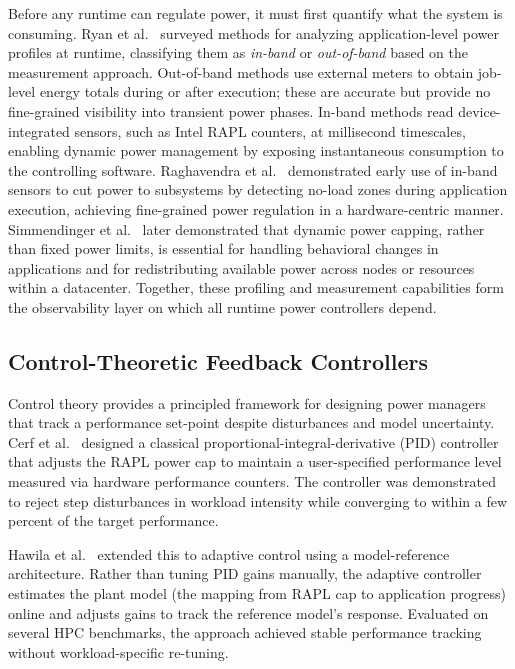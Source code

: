 Before any runtime can regulate power, it must first quantify what the system is
consuming.
Ryan et al.~\cite{8323587} surveyed methods for analyzing application-level power
profiles at runtime, classifying them as \emph{in-band} or \emph{out-of-band}
based on the measurement approach.
Out-of-band methods use external meters to obtain job-level energy totals during
or after execution; these are accurate but provide no fine-grained visibility into
transient power phases.
In-band methods read device-integrated sensors, such as Intel RAPL counters, at
millisecond timescales, enabling dynamic power management by exposing instantaneous
consumption to the controlling software.
Raghavendra et al.~\cite{raghavendra2008no} demonstrated early use of in-band
sensors to cut power to subsystems by detecting no-load zones during application
execution, achieving fine-grained power regulation in a hardware-centric manner.
Simmendinger et al.~\cite{10740868} later demonstrated that dynamic power capping,
rather than fixed power limits, is essential for handling behavioral changes in
applications and for redistributing available power across nodes or resources
within a datacenter.
Together, these profiling and measurement capabilities form the observability layer
on which all runtime power controllers depend.

\subsection{Control-Theoretic Feedback Controllers}

Control theory provides a principled framework for designing power managers
that track a performance set-point despite disturbances and model uncertainty.
Cerf et al.~\cite{cerf2021sustaining} designed a classical
proportional-integral-derivative (PID) controller that adjusts the RAPL power
cap to maintain a user-specified performance level measured via hardware
performance counters.  The controller was demonstrated to reject step
disturbances in workload intensity while converging to within a few percent of
the target performance.

Hawila et al.~\cite{ccta22} extended this to adaptive control using a
model-reference architecture.  Rather than tuning PID gains manually, the
adaptive controller estimates the plant model (the mapping from RAPL cap to
application progress) online and adjusts gains to track the reference model's
response.  Evaluated on several HPC benchmarks, the approach achieved stable
performance tracking without workload-specific re-tuning.


